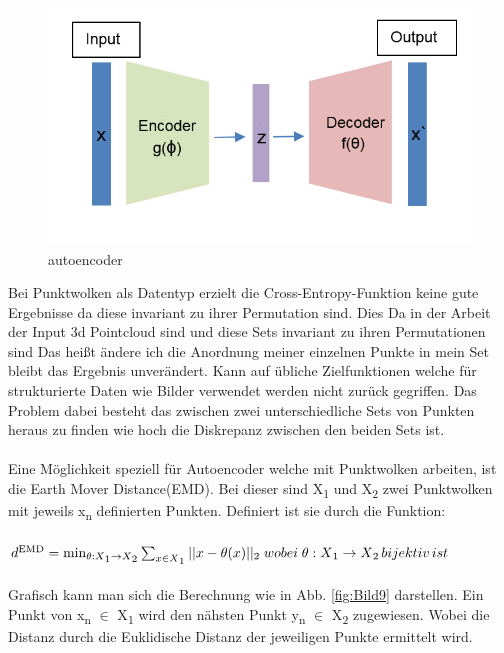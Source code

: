 \documentclass{llncs}
\begin{document}
	\begin{figure}[htbp] 
		\centering
		\includegraphics[width=1.0\textwidth]{autoencoder.png}
		\caption{autoencoder}
		\label{fig:Bild8}
	\end{figure}

	Bei Punktwolken als Datentyp erzielt die Cross-Entropy-Funktion keine gute Ergebnisse da diese invariant zu ihrer Permutation sind. Dies Da in der Arbeit der Input 3d Pointcloud sind und diese Sets  invariant zu ihren Permutationen sind Das heißt ändere ich die Anordnung meiner einzelnen Punkte in mein Set bleibt das Ergebnis unverändert.  Kann auf übliche Zielfunktionen welche für strukturierte Daten wie Bilder verwendet werden nicht zurück gegriffen. Das Problem dabei besteht das zwischen zwei unterschiedliche Sets von Punkten heraus zu finden wie hoch die Diskrepanz zwischen den beiden Sets ist\cite{invariant}. 
	\\\\
	Eine Möglichkeit speziell für Autoencoder welche mit Punktwolken arbeiten, ist die Earth Mover Distance(EMD). Bei dieser sind X\textsubscript{1} und X\textsubscript{2} zwei Punktwolken mit jeweils x\textsubscript{n} definierten Punkten\cite{autoencoderloss}. Definiert ist sie durch die Funktion:
	\\\\
	\begin{math}
	d\textsuperscript{EMD}=\min_{\theta : X\textsubscript{1}\rightarrow X\textsubscript{2}}  \sum_{x\in X\textsubscript{1}}|| x - \theta(x)||\textsubscript{2} \;wobei\;\theta: X\textsubscript{1} \rightarrow X\textsubscript{2}\, bijektiv\, ist 
	\end{math}
	\\\\
	Grafisch kann man sich die Berechnung wie in Abb. \ref{fig:Bild9} darstellen. Ein Punkt von x\textsubscript{n} $\in$ X\textsubscript{1} wird den nähsten Punkt y\textsubscript{n} $\in$  X\textsubscript{2} zugewiesen. Wobei die Distanz durch die Euklidische Distanz der jeweiligen Punkte ermittelt wird.
\end{document}
